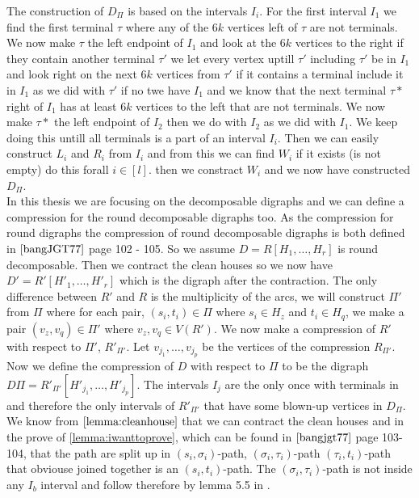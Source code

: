 The construction of $D_{\Pi}$ is based on the intervals $I_i$. 
For the first interval $I_1$ we find the first terminal $\tau$ where any of the $6k$ vertices left of $\tau$ are not terminals.
We now make $\tau$ the left endpoint of $I_1$ and look at the $6k$ vertices to the right if they contain another terminal $\tau '$ we let every vertex uptill $\tau '$ including $\tau '$ be in $I_1$ and look right on the next $6k$ vertices from $\tau '$ if it contains a terminal include it in $I_1$ as we did with $\tau '$ if no twe have $I_1$ and we know that the next terminal $\tau *$ right of $I_1$ has at least $6k$ vertices to the left that are not terminals. We now make $\tau *$ the left endpoint of $I_2$ then we do with $I_2$ as we did with $I_1$.
We keep doing this untill all terminals is a part of an interval $I_i$.
Then we can easily construct $L_i$ and $R_i$ from $I_i$ and from this we can find $W_i$ if it exists (is not empty) do this forall $i\in [l]$. then we constract $W_i$ and we now have constructed $D_\Pi$. \\
In this thesis we are focusing on the decomposable digraphs and we can define a compression for the round decomposable digraphs too. As the compression for round digraphs the compression of round decomposable digraphs is both defined in $\cite{bangJGT77}$ page 102 - 105.
So we assume $D=R[H_1,\dots ,H_r]$ is round decomposable. 
Then we contract the clean houses so we now have $D'=R'[H'_1,\dots ,H'_r]$ which is the digraph after the contraction. 
The only difference between $R'$ and $R$ is the multiplicity of the arcs, we will construct $\Pi '$ from $\Pi$ where for each pair, $(s_i,t_i)\in \Pi$ where $s_i\in H_z$ and $t_i\in H_q$, we make a pair $(v_z,v_q)\in \Pi'$ where $v_z,v_q\in V(R')$.
We now make a compression of $R'$ with respect to $\Pi'$, $R'_{\Pi'}$. 
Let $v_{j_1},\dots ,v_{j_p}$ be the vertices of the compression $R_{\Pi'}$.\\
Now we define the compression of $D$ with respect to $\Pi$ to be the digraph $D\Pi=R'_{\Pi'}[H'_{j_1},\dots ,H'_{j_p}]$.
The intervals $I_j$ are the only once with terminals in and therefore the only intervals of $R'_{\Pi'}$ that have some blown-up vertices in $D_\Pi$.
We know from $\autoref{lemma:cleanhouse}$ that we can contract the clean houses and in the prove of \autoref{lemma:iwanttoprove}, which can be found in $\cite{bangjgt77}$ page 103-104, that the path are split up in $(s_i,\sigma _i)$-path, $(\sigma_i,\tau_i)$-path $(\tau_i,t_i)$-path that obviouse joined together is an $(s_i,t_i)$-path. 
The $(\sigma_i,\tau_i)$-path is not inside any $I_b$ interval and follow therefore by lemma 5.5 in \cite{bangJGT77}. 
